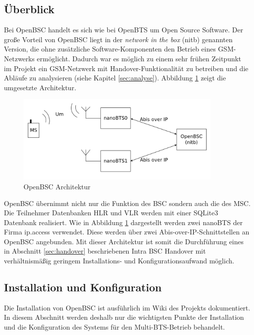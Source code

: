 \label{sec:openbsc}

\subsection{Überblick}

Bei OpenBSC handelt es sich wie bei OpenBTS um Open Source Software. Der große Vorteil von OpenBSC liegt in der \textit{network in the box} (nitb) genannten Version, die ohne zusätzliche Software-Komponenten den Betrieb eines GSM-Netzwerks ermöglicht. Dadurch war es möglich zu einem sehr frühen Zeitpunkt im Projekt ein GSM-Netzwerk mit Handover-Funktionalität zu betreiben und die Abläufe zu analysieren (siehe Kapitel \ref{sec:analyse}). Abbildung \ref{fig:openbscarch} zeigt die umgesetzte Architektur.

\begin{figure}[h!]
  \centering
  \includegraphics[width=0.9\textwidth]{img/openbscarch}
  \caption{OpenBSC Architektur}
  \label{fig:openbscarch}
\end{figure}

OpenBSC übernimmt nicht nur die Funktion des BSC sondern auch die des MSC. Die Teilnehmer Datenbanken HLR und VLR werden mit einer SQLite3 Datenbank realisiert. Wie in Abbildung \ref{fig:openbscarch} dargestellt werden zwei nanoBTS der Firma ip.access verwendet. Diese werden über zwei Abis-over-IP-Schnittstellen an OpenBSC angebunden. Mit dieser Architektur ist somit die Durchführung eines in Abschnitt \ref{sec:handover} beschriebenen Intra BSC Handover mit verhältnismäßig geringem Installations- und Konfigurationsaufwand möglich.

\subsection{Installation und Konfiguration}

Die Installation von OpenBSC ist ausführlich im Wiki des Projekts \cite{bib:buildopenbsc} dokumentiert. In diesem Abschnitt werden deshalb nur die wichtigsten Punkte der Installation und die Konfiguration des Systems für den Multi-BTS-Betrieb behandelt.

